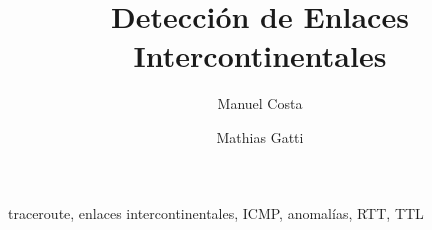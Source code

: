 \documentclass[%
	final, %
	notitlepage,
	narroweqnarray,
	inline,
	twoside,
	]{ieee}
\begin{document}
\title[Traceroute]{%
	Detección de Enlaces Intercontinentales
}

\author[COSTA, GATTI]{
\and{}Manuel Costa %
\and{}Mathias Gatti
}



\maketitle               

\begin{abstract} 
\end{abstract}

\begin{keywords}
traceroute, enlaces intercontinentales, ICMP, anomalías, RTT, TTL
\end{keywords}















\end{document}
